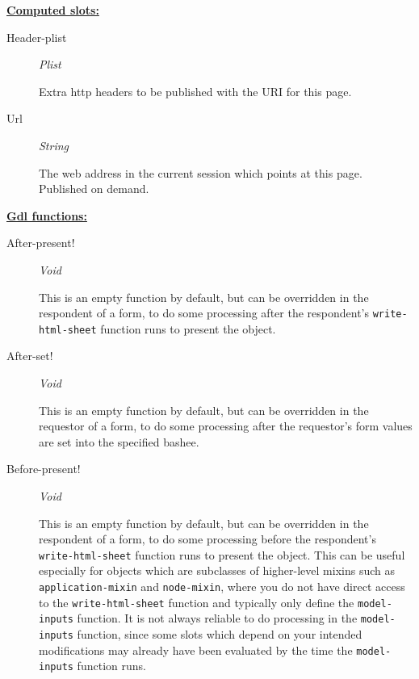 \documentclass [11pt]{book}
\begin{document}
\begin{itemize}
\begin{description}
\end{description}






\textbf{
\underline{Computed slots:}}

\begin{description}

\item [Header-plist]
\emph{Plist}

 Extra http headers to be published with the URI for this page.




\item [Url]
\emph{String}

 The web address in the current session which points at this page. Published on demand.




\end{description}






\textbf{
\underline{Gdl functions:}}

\begin{description}

\item [After-present!]
\emph{Void}

 This is an empty function by default, but can be overridden in
the respondent of a form, to do some processing after the respondent's
\texttt{write-html-sheet} function runs to present the object.




\item [After-set!]
\emph{Void}

 This is an empty function by default, but can be overridden in
the requestor of a form, to do some processing after the requestor's form
values are set into the specified bashee.




\item [Before-present!]
\emph{Void}

 This is an empty function by default, but can be overridden in
the respondent of a form, to do some processing before the respondent's
\texttt{write-html-sheet} function runs to present the object. This can be
useful especially for objects which are subclasses of higher-level mixins such as
\texttt{application-mixin} and \texttt{node-mixin}, where you do not have
direct access to the \texttt{write-html-sheet} function and typically only define
the \texttt{model-inputs} function. It is not always reliable to do processing
in the \texttt{model-inputs} function, since some slots which depend on your
intended modifications may already have been evaluated by the time the
\texttt{model-inputs} function runs.





\end{description}
\end{itemize}
\end{document}
